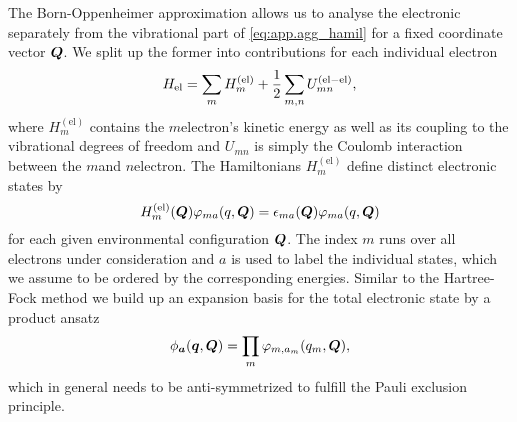 
The Born-Oppenheimer approximation allows us to analyse the electronic separately from the vibrational part of \autoref{eq:app.agg_hamil} for a fixed coordinate vector $\boldsymbol{Q}$.
We split up the former into contributions for each individual electron
\begin{equation*}
  H_\mathrm{el} = \sum_m H_m^\mathrm{(el)} + \frac{1}{2} \sum_{m,n} U_{mn}^\mathrm{(el-el)},
\end{equation*}
where $H_m^\mathrm{(el)}$ contains the $m$\th electron's kinetic energy as well as its coupling to the vibrational degrees of freedom and $U_{mn}$ is simply the Coulomb interaction between the $m$\th and $n$\th electron.
The  Hamiltonians $H_m^\mathrm{(el)}$ define distinct electronic states by
\begin{equation*}
  H_m^\mathrm{(el)}(\boldsymbol{Q}) \varphi_{ma} (q, \boldsymbol{Q}) = \epsilon_{ma}(\boldsymbol{Q}) \varphi_{ma} (q, \boldsymbol{Q})
\end{equation*}
for each given environmental configuration $\boldsymbol{Q}$.
The index $m$ runs over all electrons under consideration and $a$ is used to label the individual states, which we assume to be ordered by the corresponding energies.
Similar to the Hartree-Fock method we build up an expansion basis for the total electronic state by a product ansatz
\begin{equation}
  \phi_{\boldsymbol{a}}(\boldsymbol{q}, \boldsymbol{Q}) = \prod_m \varphi_{m, a_m}(q_m, \boldsymbol{Q}),
  \label{eq:app.product_states}
\end{equation}
which in general needs to be anti-symmetrized to fulfill the Pauli exclusion principle.

